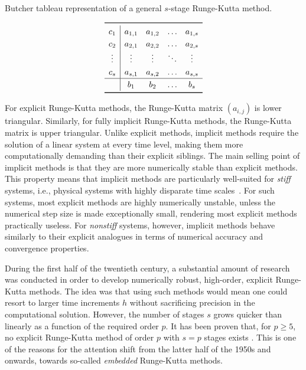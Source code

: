 \begin{table}[htpb]
    \centering
    \caption[Butcher tableau representation of a general $s$-stage
                Runge-Kutta method]{Butcher tableau representation of a general
                    $s$-stage Runge-Kutta method.}
    \label{tab:generalbutcher}
    \[\renewcommand{\arraystretch}{1.25}
        \begin{array}{c|cccc}
            \toprule
            c_{1} & a_{1,1} & a_{1,2} & \ldots & a_{1,s}\\
            c_{2} & a_{2,1} & a_{2,2} & \ldots & a_{2,s}\\
            \vdots & \vdots & \vdots & \ddots & \vdots \\
            c_{s} & a_{s,1} & a_{s,2} & \ldots & a_{s,s}\\
            \hline
            & b_{1} & b_{2} & \ldots & b_{s}\\
            \bottomrule
    \end{array}
\]
\end{table}

For explicit Runge-Kutta methods, the Runge-Kutta matrix $(a_{i,j})$ is lower
triangular. Similarly, for fully implicit Runge-Kutta methods, the Runge-Kutta
matrix is upper triangular. Unlike explicit methods, implicit methods require
the solution of a linear system at every time level, making them more
computationally demanding than their explicit siblings. The main selling point
of implicit methods is that they are more numerically stable than explicit
methods. This property means that implicit methods are particularly well-suited
for \emph{stiff} systems, i.e., physical systems with highly disparate time
scales~\parencite[p.2]{hairer1996solving}. For such systems,
most explicit methods are highly numerically unstable, unless the numerical step
size is made exceptionally small, rendering most explicit methods practically
useless. For \emph{nonstiff} systems, however, implicit methods behave similarly
to their explicit analogues in terms of numerical accuracy and
convergence properties.

\clearpage

During the first half of the twentieth century, a substantial amount of research
was conducted in order to develop numerically robust, high-order, explicit
Runge-Kutta methods. The idea was that using such methods would mean one could
resort to larger time increments $h$ without sacrificing precision in the
computational solution. However, the number of stages $s$ grows quicker than
linearly as a function of the required order $p$. It has been proven
that, for $p\geq5$, no explicit Runge-Kutta method of order $p$ with $s=p$
stages exists \parencite[p.173]{hairer1993solving}. This is
one of the reasons for the attention shift from the latter half of the 1950s
and onwards, towards so-called \emph{embedded} Runge-Kutta methods.

